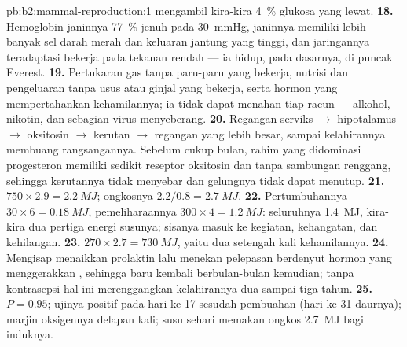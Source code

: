 \begin{solution}{pb:b2:mammal-reproduction:1}
mengambil kira-kira \qty{4}{\%} glukosa yang lewat.
\textbf{18.} Hemoglobin janinnya \qty{77}{\%} jenuh pada
\qty{30}{mmHg}, janinnya memiliki lebih banyak sel darah merah dan
keluaran jantung yang tinggi, dan jaringannya teradaptasi bekerja pada
tekanan rendah --- ia hidup, pada dasarnya, di puncak Everest.
\textbf{19.} Pertukaran gas tanpa paru-paru yang bekerja, nutrisi dan
pengeluaran tanpa usus atau ginjal yang bekerja, serta hormon yang
mempertahankan kehamilannya; ia tidak dapat menahan tiap racun ---
alkohol, nikotin, dan sebagian virus menyeberang.
\textbf{20.} Regangan serviks $\to$ hipotalamus $\to$ oksitosin $\to$
kerutan $\to$ regangan yang lebih besar, sampai kelahirannya membuang
rangsangannya. Sebelum cukup bulan, rahim yang didominasi progesteron
memiliki sedikit reseptor oksitosin dan tanpa sambungan renggang,
sehingga kerutannya tidak menyebar dan gelungnya tidak dapat menutup.
\textbf{21.} $750\times 2.9 = \qty{2.2}{MJ}$; ongkosnya $2.2/0.8 =
\qty{2.7}{MJ}$.
\textbf{22.} Pertumbuhannya $30\times 6 = \qty{0.18}{MJ}$,
pemeliharaannya $300\times 4 = \qty{1.2}{MJ}$: seluruhnya
\qty{1.4}{MJ}, kira-kira dua pertiga energi susunya; sisanya masuk ke
kegiatan, kehangatan, dan kehilangan.
\textbf{23.} $270\times 2.7 = \qty{730}{MJ}$, yaitu dua setengah kali
kehamilannya.
\textbf{24.} Mengisap menaikkan prolaktin lalu menekan pelepasan
berdenyut hormon yang menggerakkan , sehingga  baru
kembali berbulan-bulan kemudian; tanpa kontrasepsi hal ini
merenggangkan kelahirannya dua sampai tiga tahun.
\textbf{25.} $P = 0.95$; ujinya positif pada hari ke-17 sesudah
pembuahan (hari ke-31 daurnya); marjin oksigennya delapan kali; susu
sehari memakan ongkos \qty{2.7}{MJ} bagi induknya.
\end{solution}
